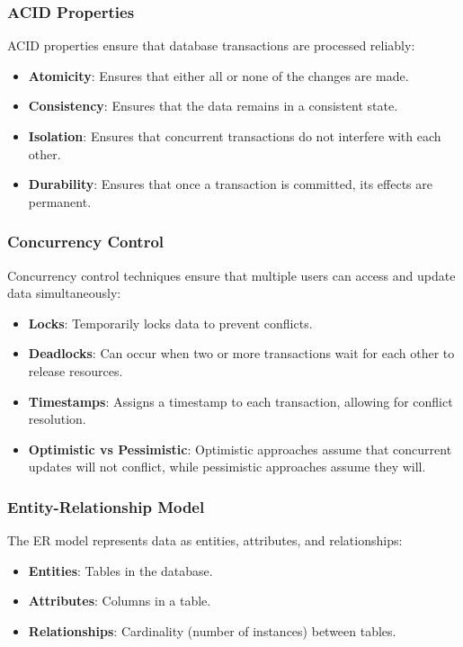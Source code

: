\documentclass[11pt,letterpaper]{article}
\begin{document}
\subsubsection*{ACID Properties}
ACID properties ensure that database transactions are processed reliably:
\begin{itemize}
  \item \textbf{Atomicity}: Ensures that either all or none of the changes are made.
  \item \textbf{Consistency}: Ensures that the data remains in a consistent state.
  \item \textbf{Isolation}: Ensures that concurrent transactions do not interfere with each other.
  \item \textbf{Durability}: Ensures that once a transaction is committed, its effects are permanent.
\end{itemize}

\subsubsection*{Concurrency Control}
Concurrency control techniques ensure that multiple users can access and update data simultaneously:
\begin{itemize}
  \item \textbf{Locks}: Temporarily locks data to prevent conflicts.
  \item \textbf{Deadlocks}: Can occur when two or more transactions wait for each other to release resources.
  \item \textbf{Timestamps}: Assigns a timestamp to each transaction, allowing for conflict resolution.
  \item \textbf{Optimistic vs Pessimistic}: Optimistic approaches assume that concurrent updates will not conflict, while pessimistic approaches assume they will.
\end{itemize}

\subsubsection*{Entity-Relationship Model}
The ER model represents data as entities, attributes, and relationships:
\begin{itemize}
  \item \textbf{Entities}: Tables in the database.
  \item \textbf{Attributes}: Columns in a table.
  \item \textbf{Relationships}: Cardinality (number of instances) between tables.
\end{itemize}
\end{document}
